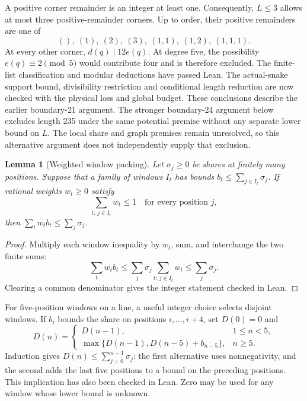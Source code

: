 \documentclass[11pt,a4paper]{article}
\newtheorem{lemma}[theorem]{Lemma}
\theoremstyle{definition}
\theoremstyle{remark}
\begin{document}
A positive corner remainder is an integer at least one. Consequently,
$L\le3$ allows at most three positive-remainder corners. Up to order,
their positive remainders are one of
\[
(),\ (1),\ (2),\ (3),\ (1,1),\ (1,2),\ (1,1,1).
\]
At every other corner, $d(q)\mid12e(q)$. At degree five, the possibility
$e(q)\equiv2\pmod5$ would contribute four and is therefore excluded.
The finite-list classification and modular deductions have passed Lean.
The actual-snake support bound, divisibility restriction and conditional
length reduction are now checked with the physical loss and global budget.
These conclusions describe the earlier boundary-21 argument. The stronger
boundary-24 argument below excludes length 235 under the same potential
premise without any separate lower bound on $L$. The local share and graph
premises remain unresolved, so this alternative argument does not
independently supply that exclusion.

\begin{lemma}[Weighted window packing]\label{lem:share-packing}
Let $\sigma_j\ge0$ be shares at finitely many positions. Suppose that a family of windows $I_t$ has bounds $b_t\le\sum_{j\in I_t}\sigma_j$. If rational weights $w_t\ge0$ satisfy
\[
\sum_{t:\,j\in I_t}w_t\le1\quad\text{for every position }j,
\]
then $\sum_t w_t b_t\le\sum_j\sigma_j$.
\end{lemma}
\begin{proof}
Multiply each window inequality by $w_t$, sum, and interchange the two finite sums:
\[
\sum_t w_t b_t\le\sum_j\sigma_j\sum_{t:\,j\in I_t}w_t\le\sum_j\sigma_j.
\]
Clearing a common denominator gives the integer statement checked in Lean.
\end{proof}
For five-position windows on a line, a useful integer choice selects disjoint windows. If $b_i$ bounds the share on positions $i,\ldots,i+4$, set $D(0)=0$ and
\[
D(n)=
\begin{cases}
D(n-1),&1\le n<5,\\
\max\{D(n-1),D(n-5)+b_{n-5}\},&n\ge5.
\end{cases}
\]
Induction gives $D(n)\le\sum_{j=0}^{n-1}\sigma_j$: the first alternative uses nonnegativity, and the second adds the last five positions to a bound on the preceding positions. This implication has also been checked in Lean. Zero may be used for any window whose lower bound is unknown.
\end{document}
